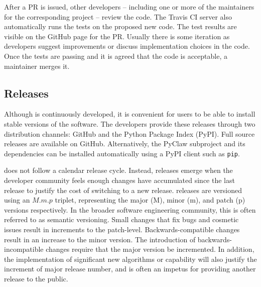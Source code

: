After a PR is issued, other developers -- including one or more of the
maintainers for the corresponding project -- review the code.  The Travis
CI server also automatically runs the tests on the proposed new code.  The test
results are visible on the GitHub page for the PR.  Usually there is
some iteration as developers suggest improvements or discuss
implementation choices in the code.  Once the tests are passing and it
is agreed that the code is acceptable, a maintainer merges it.

\subsection{Releases}

Although \clawpack is continuously developed, it is convenient for
users to be able to install stable versions of the software.  The
\clawpack developers provide these releases through two distribution
channels: GitHub and the Python Package Index (PyPI).  Full source
releases are available on GitHub.  Alternatively, the PyClaw
subproject and its dependencies can be installed automatically using a
PyPI client such as \texttt{pip}.

\clawpack does not follow a calendar release cycle.  Instead, releases
emerge when the developer community feels enough changes have
accumulated since the last release to justify
the cost of switching to a new release.  \clawpack releases are
versioned using an $M.m.p$ triplet, representing the major (M), minor (m), and
patch (p) versions respectively.  In the broader software engineering
community, this is often referred to as semantic versioning.  Small
changes that fix bugs and cosmetic issues result in increments to the
patch-level.  Backwards-compatible changes result in an increase to
the minor version.  The introduction of backwards-incompatible changes
require that the major version be incremented.  In addition, the
implementation of significant new algorithms or capability will also
justify the increment of major release number, and is often an impetus
for providing another release to the public.
